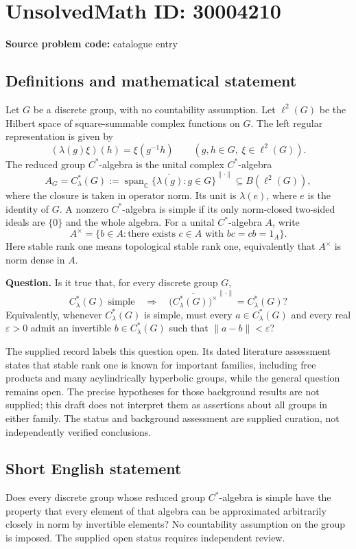 \documentclass[11pt]{article}
\newcommand{\C}{\mathbb{C}}
\begin{document}
\section*{UnsolvedMath ID: 30004210}
\textbf{Source problem code:} catalogue entry
\subsection{Definitions and mathematical statement}
Let \(G\) be a discrete group, with no countability assumption. Let \(\ell^2(G)\) be the Hilbert space of square-summable complex functions on \(G\). The left regular representation is given by
\[
 (\lambda(g)\xi)(h)=\xi(g^{-1}h)
 \qquad(g,h\in G,\ \xi\in\ell^2(G)).
\]
The reduced group \(C^*\)-algebra is the unital complex \(C^*\)-algebra
\[
 A_G=C^*_{\lambda}(G)
 :=\overline{\operatorname{span}_{\C}\{\lambda(g):g\in G\}}^{\|\cdot\|}
 \subseteq B(\ell^2(G)),
\]
where the closure is taken in operator norm. Its unit is \(\lambda(e)\), where \(e\) is the identity of \(G\). A nonzero \(C^*\)-algebra is simple if its only norm-closed two-sided ideals are \(\{0\}\) and the whole algebra. For a unital \(C^*\)-algebra \(A\), write
\[
 A^{\times}=\{b\in A:\text{there exists }c\in A\text{ with }bc=cb=1_A\}.
\]
Here stable rank one means topological stable rank one, equivalently that \(A^{\times}\) is norm dense in \(A\).

\textbf{Question.} Is it true that, for every discrete group \(G\),
\[
 C^*_{\lambda}(G)\text{ simple}
 \quad\Longrightarrow\quad
 \overline{\bigl(C^*_{\lambda}(G)\bigr)^{\times}}^{\|\cdot\|}
 =C^*_{\lambda}(G)?
\]
Equivalently, whenever \(C^*_{\lambda}(G)\) is simple, must every \(a\in C^*_{\lambda}(G)\) and every real \(\varepsilon>0\) admit an invertible \(b\in C^*_{\lambda}(G)\) such that \(\|a-b\|<\varepsilon\)?

The supplied record labels this question open. Its dated literature assessment states that stable rank one is known for important families, including free products and many acylindrically hyperbolic groups, while the general question remains open. The precise hypotheses for those background results are not supplied; this draft does not interpret them as assertions about all groups in either family. The status and background assessment are supplied curation, not independently verified conclusions.
\subsection{Short English statement}
Does every discrete group whose reduced group \(C^*\)-algebra is simple have the property that every element of that algebra can be approximated arbitrarily closely in norm by invertible elements? No countability assumption on the group is imposed. The supplied open status requires independent review.
\end{document}

